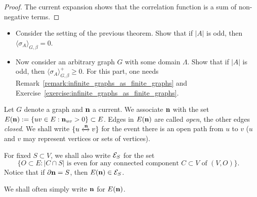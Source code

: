 \begin{proof}
    The current expansion shows that the correlation function is a sum of
    non-negative terms.
\end{proof}

\begin{exercise}
    \label{exo:correlation_functions_with_odd_sets}
    \begin{itemize}
        \item     Consider the setting of the previous theorem.
        Show that if $|A|$ is odd, then $\langle\sigma_A\rangle_{G,\beta}=0$.
        \item Now consider an arbitrary graph $G$ with some domain $\Lambda$.
        Show that if $|A|$ is odd, then $\langle\sigma_A\rangle_{G,\beta}^+\geq 0$.
        For this part, one needs Remark~\ref{remark:infinite_graphs_as_finite_graphs}
        and Exercise~\ref{exercise:infinite_graphs_as_finite_graphs}.
    \end{itemize}
\end{exercise}

\begin{definition}
    Let $G$ denote a graph and $\mathbf{n}$ a current.
    We associate $\mathbf{n}$ with the set $E(\mathbf{n}):=\{uv\in E:\mathbf{n}_{uv}>0\}\subset E$.
    Edges in $E(\mathbf{n})$ are called \emph{open},
    the other edges \emph{closed}.
    We shall write $\{u\xleftrightarrow{\mathbf{n}}v\}$
    for the event there is an open path from $u$ to $v$
    ($u$ and $v$ may represent vertices or sets of vertices).

    For fixed $S\subset V$, we shall also write $\mathcal E_S$ for the set
    \[
        \{O\subset E:\text{$|C\cap S|$ is even for any connected component $C\subset V$ of $(V,O)$}\}.
    \]
    Notice that if $\partial\mathbf{n}=S$,
    then $E(\mathbf{n})\in\mathcal E_S$.

    We shall often simply write $\mathbf{n}$ for $E(\mathbf{n})$.
\end{definition}

